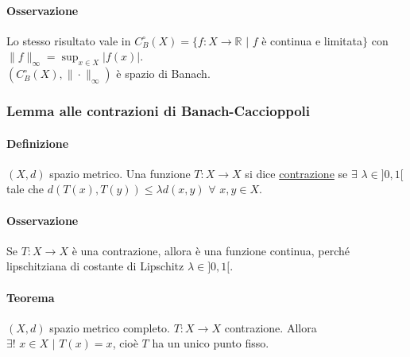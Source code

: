 \documentclass{article}
\newcommand{\R}{\mathbb{R}}
\begin{document}
\paragraph{{Osservazione}}
Lo stesso risultato vale in $C^\circ_B(X) =\{f:X \rightarrow \R \,\, | \,\, f$ è continua e limitata$\}$ con $\|f\|_\infty = \sup_{x \in X}|f(x)|$.\\
$(C^\circ_B(X),\|\cdot\|_\infty)$ è spazio di Banach.

\subsubsection{Lemma alle contrazioni di Banach-Caccioppoli}
\paragraph{Definizione}
$(X,d)$ spazio metrico. Una funzione $T:X\rightarrow X $ si dice \underline{contrazione} se $\exists\,\, \lambda \in ]0,1[$ tale che $d(T(x),T(y))\leq \lambda d(x,y) \,\, \forall\,\, x,y \in X$. 

\paragraph{{Osservazione}}
Se $T:X \rightarrow X$ è una contrazione, allora è una funzione continua, perché lipschitziana di costante di Lipschitz $\lambda \in ]0,1[$. 

\paragraph{{Teorema}}
$(X,d)$ spazio metrico completo. $T:X \rightarrow X$ contrazione. Allora $\exists! \,\, x \in X \,\, | \,\, T(x) = x$, cioè $T$ ha un unico punto fisso.
\end{document}
